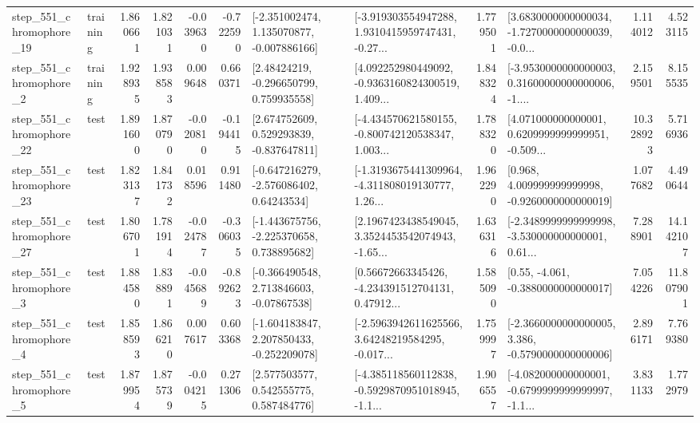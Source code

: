 \begin{tabular}{llrrrrllrlrr}
  step\_551\_chromophore\_19 &  training &      1.860661 &    1.821031 &     -0.039630 & -0.722590 &   [-2.351002474, 1.135070877, -0.007886166] &  [-3.919303554947288, 1.9310415959747431, -0.27... &       1.779501 &  [3.6830000000000034, -1.7270000000000039, -0.0... &            1.114012 &          4.523115 \\
   step\_551\_chromophore\_2 &  training &      1.928935 &    1.938583 &      0.009648 &  0.660371 &     [2.48424219, -0.296650799, 0.759935558] &  [4.092252980449092, -0.9363160824300519, 1.409... &       1.848324 &  [-3.9530000000000003, 0.31600000000000006, -1.... &            2.159501 &          8.155535 \\
  step\_551\_chromophore\_22 &      test &      1.891600 &    1.870790 &     -0.020810 & -0.194415 &    [2.674752609, 0.529293839, -0.837647811] &  [-4.434570621580155, -0.800742120538347, 1.003... &       1.788320 &  [4.071000000000001, 0.6209999999999951, -0.509... &           10.328923 &          5.716936 \\
  step\_551\_chromophore\_23 &      test &      1.823137 &    1.841732 &      0.018596 &  0.911480 &    [-0.647216279, -2.576086402, 0.64243534] &  [-1.3193675441309964, -4.311808019130777, 1.26... &       1.962290 &    [0.968, 4.009999999999998, -0.9260000000000019] &            1.077682 &          4.490644 \\
  step\_551\_chromophore\_27 &      test &      1.806701 &    1.781914 &     -0.024787 & -0.306035 &   [-1.443675756, -2.225370658, 0.738895682] &  [2.1967423438549045, 3.3524453542074943, -1.65... &       1.636316 &  [-2.3489999999999998, -3.530000000000001, 0.61... &            7.288901 &         14.142107 \\
   step\_551\_chromophore\_3 &      test &      1.884580 &    1.838891 &     -0.045689 & -0.892623 &    [-0.366490548, 2.713846603, -0.07867538] &  [0.56672663345426, -4.234391512704131, 0.47912... &       1.585090 &                [0.55, -4.061, -0.3880000000000017] &            7.054226 &         11.807901 \\
   step\_551\_chromophore\_4 &      test &      1.858593 &    1.866210 &      0.007617 &  0.603368 &   [-1.604183847, 2.207850433, -0.252209078] &  [-2.5963942611625566, 3.64248219584295, -0.017... &       1.759997 &  [-2.3660000000000005, 3.386, -0.5790000000000006] &            2.896171 &          7.769380 \\
   step\_551\_chromophore\_5 &      test &      1.879954 &    1.875739 &     -0.004215 &  0.271306 &     [2.577503577, 0.542555775, 0.587484776] &  [-4.385118560112838, -0.5929870951018945, -1.1... &       1.906557 &  [-4.082000000000001, -0.6799999999999997, -1.1... &            3.831133 &          1.772979 \\

\end{tabular}
